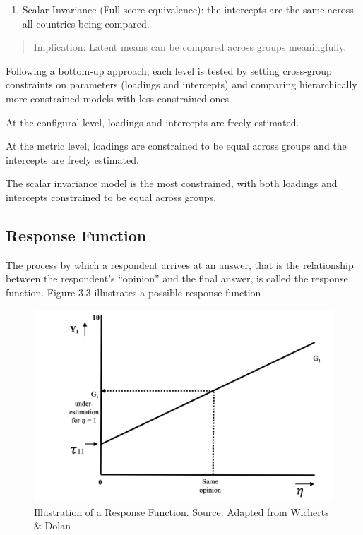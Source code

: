 \documentclass[
]{book}
\providecommand{\tightlist}{%
  \setlength{\itemsep}{0pt}\setlength{\parskip}{0pt}}
\begin{document}
\begin{enumerate}
\def\labelenumi{\arabic{enumi}.}
\setcounter{enumi}{2}
\tightlist
\item
  Scalar Invariance (Full score equivalence): the intercepts are the same across all countries being compared.
\end{enumerate}

\begin{quote}
Implication: Latent means can be compared across groups meaningfully.
\end{quote}

Following a bottom-up approach, each level is tested by setting cross-group constraints on parameters (loadings and intercepts) and comparing hierarchically more constrained models with less constrained ones.

At the configural level, loadings and intercepts are freely estimated.

At the metric level, loadings are constrained to be equal across groups and the intercepts are freely estimated.

The scalar invariance model is the most constrained, with both loadings and intercepts constrained to be equal across groups.

\hypertarget{response-function}{%
\subsection{Response Function}\label{response-function}}

The process by which a respondent arrives at an answer, that is the relationship between the respondent's ``opinion'' and the final answer, is called the response function. Figure 3.3 illustrates a possible response function

\begin{figure}
\includegraphics[width=0.8\linewidth]{response_function} \caption{Illustration of a Response Function. Source: Adapted from Wicherts & Dolan}\label{fig:response}
\end{figure}
\end{document}
